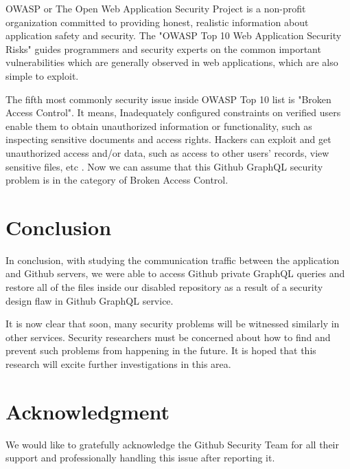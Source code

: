 \documentclass[conference]{IEEEtran}
\begin{document}
OWASP or The Open Web Application Security Project\cite{owasp2017top} is a non-profit organization committed to providing honest, realistic information about application safety and security. The "OWASP Top 10 Web Application Security Risks"\cite{owasp2017top} guides programmers and security experts on the common important vulnerabilities which are generally observed in web applications, which are also simple to exploit.

The fifth most commonly security issue inside OWASP Top 10 list is "Broken Access Control". It means, Inadequately configured constraints on verified users enable them to obtain unauthorized information or functionality, such as inspecting sensitive documents and access rights. Hackers can exploit and get unauthorized access and/or data, such as access to other users' records, view sensitive files, etc \cite{owasp2017top}. Now we can assume that this Github GraphQL security problem is in the category of Broken Access Control.  

\section*{Conclusion}

In conclusion, with studying the communication traffic between the application and Github servers, we were able to access Github private GraphQL queries and restore all of the files inside our disabled repository as a result of a security design flaw in Github GraphQL service.

It is now clear that soon, many security problems will be witnessed similarly in other services. Security researchers must be concerned about how to find and prevent such problems from happening in the future. It is hoped that this research will excite further investigations in this area.



\section*{Acknowledgment}

We would like to gratefully acknowledge the Github Security Team for all their support and professionally handling this issue after reporting it.

\newpage


\end{document}
